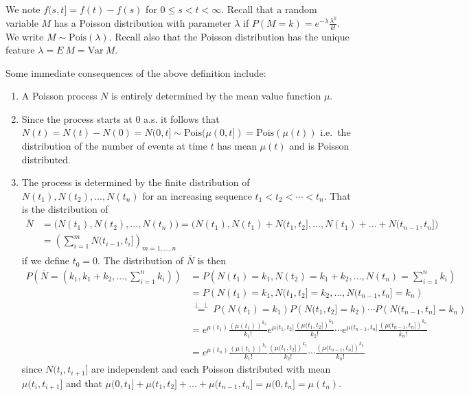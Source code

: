\documentclass[a4paper,12pt,openany]{book}
\providecommand{\tightlist}{%
 \setlength{\itemsep}{0pt}\setlength{\parskip}{0pt}}
\begin{document}
We note \(f(s,t]=f(t)-f(s)\) for \(0\le s<t<\infty\). Recall that a random variable \(M\) has a Poisson distribution with parameter \(\lambda\) if \(P(M=k)=e^{-\lambda}\frac{\lambda^k}{k!}\). We write \(M\sim \text{Pois}(\lambda)\). Recall also that the Poisson distribution has the unique feature \(\lambda = E\ M=\text{Var}\ M\).

Some immediate consequences of the above definition include:

\begin{enumerate}
\def\labelenumi{(\arabic{enumi})}
\tightlist
\item
  A Poisson process \(N\) is entirely determined by the mean value function \(\mu\).
\item
  Since the process starts at 0 a.s. it follows that \(N(t)=N(t)-N(0)=N(0,t]\sim \text{Pois}(\mu(0,t])=\text{Pois}(\mu(t))\) i.e.~the distribution of the number of events at time \(t\) has mean \(\mu(t)\) and is Poisson distributed.
\item
  The process is determined by the finite distribution of \(N(t_1),N(t_2),...,N(t_n)\) for an increasing sequence \(t_1<t_2<\cdots <t_n\). That is the distribution of
  \begin{align*}
    \overline{N}&=\Big(N(t_1),N(t_2),...,N(t_n)\Big)=\Big(N(t_1),N(t_1)+N(t_1,t_2],...,N(t_1)+...+N(t_{n-1},t_n]\Big)\\
    &=\left(\sum_{i=1}^{m}N(t_{i-1},t_{i}]\right)_{m=1,...,n}
    \end{align*}
  if we define \(t_0=0\). The distribution of \(\overline{N}\) is then
  \begin{align*}
    P\left(\overline{N}=(k_1,k_1+k_2,...,\sum_{i=1}^nk_i)\right)&=P\left(N(t_1)=k_1,N(t_2)=k_1+k_2,...,N(t_n)=\sum_{i=1}^nk_i\right)\\
    &=P\left(N(t_1)=k_1,N(t_1,t_2]=k_2,...,N(t_{n-1},t_n]=k_n\right)\\
    &\stackrel{\perp \!\!\! \perp}{=}P\left(N(t_1)=k_1\right)P\left(N(t_1,t_2]=k_2\right)\cdots P\left(N(t_{n-1},t_n]=k_n\right)\\
    &=e^{\mu(t_1)}\frac{\left(\mu(t_1)\right)^{k_1}}{k_1!}e^{\mu(t_1,t_2]}\frac{\left(\mu(t_1,t_2]\right)^{k_2}}{k_2!}\cdots e^{\mu(t_{n-1},t_n]}\frac{\left(\mu(t_{n-1},t_n]\right)^{k_n}}{k_n!}\\
    &=e^{\mu(t_n)}\frac{\left(\mu(t_1)\right)^{k_1}}{k_1!}\frac{\left(\mu(t_1,t_2]\right)^{k_2}}{k_2!}\cdots \frac{\left(\mu(t_{n-1},t_n]\right)^{k_n}}{k_n!}
    \end{align*}
  since \(N(t_i,t_{i+1}]\) are independent and each Poisson distributed with mean \(\mu(t_i,t_{i+1}]\) and that \(\mu(0,t_1]+\mu(t_1,t_2]+...+\mu(t_{n-1},t_n]=\mu(0,t_n]=\mu(t_n)\).
\end{enumerate}
\end{document}

